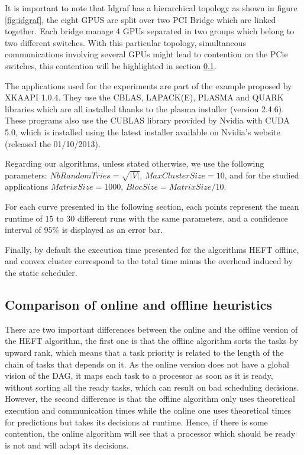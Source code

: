 \documentclass[10pt, conference, compsocconf,pdftex,dvipsnames]{IEEEtran}
\begin{document}
It is important to note that Idgraf has a hierarchical topology as shown in
figure \ref{fig:idgraf}, the eight GPUS are split over two PCI Bridge which
are linked together. Each bridge manage 4 GPUs separated in two groups which
belong to two different switches. With this particular topology, simultaneous
communications involving several GPUs might lead to contention on the PCie
switches, this contention will be highlighted in section
\ref{sec:exp-exp-perf}.

The applications used for the experiments are part of the example proposed by
XKAAPI 1.0.4. They use the CBLAS, LAPACK(E), PLASMA and QUARK libraries which
are all installed thanks to the plasma installer (version 2.4.6)\cite{PLASMA}.
These programs also use the CUBLAS library provided by Nvidia with CUDA 5.0,
which is installed using the latest installer available on Nvidia's website
(released the 01/10/2013).

Regarding our algorithms, unless stated otherwise, we use the following
parameters: $NbRandomTries=\sqrt{|V|}$, $MaxClusterSize=10$, and for the
studied applications $MatrixSize=1000$, $BlocSize=MatrixSize/10$. 

For each curve presented in the following section, each points represent the
mean runtime of $15$ to $30$ different runs with the same parameters, and a
confidence interval of $95\%$ is displayed as an error bar.

Finally, by default the execution time presented for the algorithms HEFT
offline, and convex cluster correspond to the total time minus the overhead
induced by the static scheduler.

\subsection{Comparison of online and offline heuristics}
\label{sec:exp-exp-perf}

There are two important differences between the online and the offline version
of the HEFT algorithm, the first one is that the offline algorithm sorts the
tasks by upward rank, which means that a task priority is related to the
length of the chain of tasks that depends on it. As the online version does
not have a global vision of the DAG, it maps each task to a processor as soon
as it is ready, without sorting all the ready tasks, which can result on bad
scheduling decisions.  However, the second difference is that the offline
algorithm only uses theoretical execution and communication times while the
online one uses theoretical times for predictions but takes its decisions at
runtime. Hence, if there is some contention, the online algorithm will see
that a processor which should be ready is not and will adapt its decisions.
\end{document}
